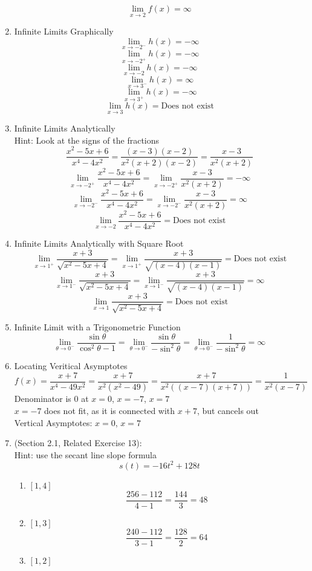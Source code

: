 \documentclass{article}
\begin{document}
\begin{enumerate}
		$$\lim_{x \to 2}{f(x)} = \infty$$
	\item Infinite Limits Graphically
		$$\lim_{x \to -2^-}{h(x)} = - \infty$$
		$$\lim_{x \to -2^+}{h(x)} = - \infty$$
		$$\lim_{x \to -2}{h(x)} = - \infty$$
		$$\lim_{x \to 3^-}{h(x)} = \infty$$
		$$\lim_{x \to 3^+}{h(x)} = - \infty$$
		$$\lim_{x \to 3}{h(x)} = \text{Does not exist}$$
	\item Infinite Limits Analytically
		\\ Hint: Look at the signs of the fractions
		$$\frac{x^2-5x+6}{x^4-4x^2} = \frac{(x - 3)(x - 2)}{x^2(x + 2)(x - 2)} = \frac{x-3}{x^2(x+2)}$$
		$$\lim_{x \to -2^+}{\frac{x^2 - 5x + 6}{x^4 - 4x^2}} = \lim_{x \to -2^+}{\frac{x-3}{x^2(x+2)}} = - \infty$$
		$$\lim_{x \to -2^-}{\frac{x^2 - 5x + 6}{x^4 - 4x^2}} = \lim_{x \to -2^-}{\frac{x-3}{x^2(x+2)}} = \infty$$
		$$\lim_{x \to -2}{\frac{x^2 - 5x + 6}{x^4 - 4x^2}} = \text{Does not exist}$$
	\item Infinite Limits Analytically with Square Root
		$$\lim_{x \to 1^+}{\frac{x + 3}{\sqrt{x^2 - 5x + 4}}} = \lim_{x \to 1^+}{\frac{x + 3}{\sqrt{(x-4)(x-1)}}} = \text{Does not exist}$$
		$$\lim_{x \to 1^-}{\frac{x + 3}{\sqrt{x^2 - 5x + 4}}} = \lim_{x \to 1^-}{\frac{x + 3}{\sqrt{(x-4)(x-1)}}} = \infty$$
		$$\lim_{x \to 1}{\frac{x + 3}{\sqrt{x^2 - 5x + 4}}} = \text{Does not exist}$$
	\item Infinite Limit with a Trigonometric Function
		$$\lim_{\theta \to 0^-}{\frac{\sin{\theta}}{\cos^2{\theta} - 1}} = \lim_{\theta \to 0^-}{\frac{\sin{\theta}}{- \sin^2{\theta}}} = \lim_{\theta \to 0^-}{\frac{1}{- \sin^2{\theta}}} = \infty$$
	\item Locating Veritical Asymptotes
		$$f(x) = \frac{x + 7}{x^4 - 49x^2} = \frac{x+7}{x^2(x^2-49)} = \frac{x+7}{x^2((x-7)(x+7))} = \frac{1}{x^2(x-7)}$$
		Denominator is $0$ at $x=0$, $x=-7$, $x=7$ \\
		$x=-7$ does not fit, as it is connected with $x+7$, but cancels out \\
		Vertical Asymptotes: $x = 0$, $x = 7$
    \item (Section 2.1, Related Exercise 13):
    	\\Hint: use the secant line slope formula
    	$$s(t) = -16t^2 + 128t$$
        \begin{enumerate}
    	    \item $[1, 4]$
    	        $$\frac{256 - 112}{4 - 1} = \frac{144}{3} = 48$$
    	    \item $[1, 3]$
    	        $$\frac{240 - 112}{3 - 1} = \frac{128}{2} = 64$$
    	    \item $[1, 2]$

\end{enumerate}
\end{enumerate}
\end{document}
